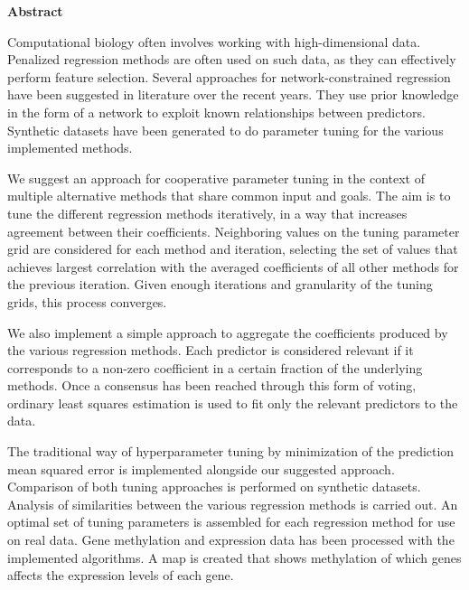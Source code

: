 \newpage
{\Huge \bf Abstract}
\vspace{24pt} 

Computational biology often involves working with high-dimensional data. Penalized regression methods are often used on such data, as they can effectively perform feature selection. Several approaches for network-constrained regression have been suggested in literature over the recent years. They use prior knowledge in the form of a network to exploit known relationships between predictors. Synthetic datasets have been generated to do parameter tuning for the various implemented methods. 

We suggest an approach for cooperative parameter tuning in the context of multiple alternative methods that share common input and goals. The aim is to tune the different regression methods iteratively, in a way that increases agreement between their coefficients. Neighboring values on the tuning parameter grid are considered for each method and iteration, selecting the set of values that achieves largest correlation with the averaged coefficients of all other methods for the previous iteration. Given enough iterations and granularity of the tuning grids, this process converges.

We also implement a simple approach to aggregate the coefficients produced by the various regression methods. Each predictor is considered relevant if it corresponds to a non-zero coefficient in a certain fraction of the underlying methods. Once a consensus has been reached through this form of voting, ordinary least squares estimation is used to fit only the relevant predictors to the data.

The traditional way of hyperparameter tuning by minimization of the prediction mean squared error is implemented alongside our suggested approach. Comparison of both tuning approaches is performed on synthetic datasets. Analysis of similarities between the various regression methods is carried out. An optimal set of tuning parameters is assembled for each regression method for use on real data. Gene methylation and expression data has been processed with the implemented algorithms. A map is created that shows methylation of which genes affects the expression levels of each gene.

\newpage
\vspace*{\fill}
